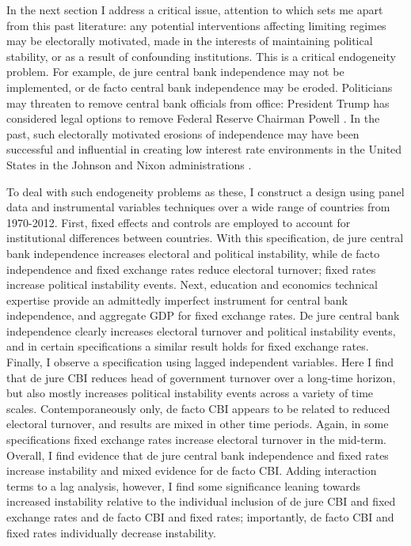\documentclass{article}
\begin{document}
    In the next section I address a critical issue, attention to which sets me apart from this past literature: any potential interventions affecting limiting regimes may be electorally motivated, made in the interests of maintaining political stability, or as a result of confounding institutions. This is a critical endogeneity problem. For example, de jure central bank independence may not be implemented, or de facto central bank independence may be eroded. Politicians may threaten to remove central bank officials from office: President Trump has considered legal options to remove Federal Reserve Chairman Powell \citep{corbett_can_2019}. In the past, such electorally motivated erosions of independence may have been successful and influential in creating low interest rate environments in the United States in the Johnson and Nixon administrations \citep{binder_trump_2019}.

    To deal with such endogeneity problems as these, I construct a design using panel data and instrumental variables techniques over a wide range of countries from 1970-2012. First, fixed effects and controls are employed to account for institutional differences between countries. With this specification, de jure central bank independence increases electoral and political instability, while de facto independence and fixed exchange rates reduce electoral turnover; fixed rates increase political instability events. Next, education and economics technical expertise provide an admittedly imperfect instrument for central bank independence, and aggregate GDP for fixed exchange rates. De jure central bank independence clearly increases electoral turnover and political instability events, and in certain specifications a similar result holds for fixed exchange rates. Finally, I observe a specification using lagged independent variables. Here I find that de jure CBI reduces head of government turnover over a long-time horizon, but also mostly increases political instability events across a variety of time scales. Contemporaneously only, de facto CBI appears to be related to reduced electoral turnover, and results are mixed in other time periods. Again, in some specifications fixed exchange rates increase electoral turnover in the mid-term. Overall, I find evidence that de jure central bank independence and fixed rates increase instability and mixed evidence for de facto CBI. Adding interaction terms to a lag analysis, however, I find some significance leaning towards increased instability relative to the individual inclusion of de jure CBI and fixed exchange rates and de facto CBI and fixed rates; importantly, de facto CBI and fixed rates individually decrease instability.
\end{document}
